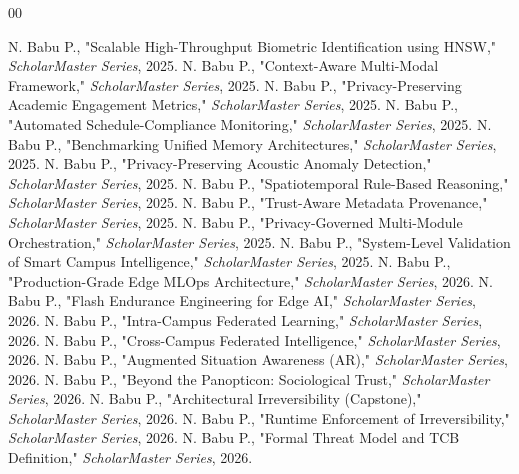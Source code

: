 \documentclass[conference]{IEEEtran}
\theoremstyle{definition}
\begin{document}
\begin{thebibliography}{00}

 N. Babu P., "Scalable High-Throughput Biometric Identification using HNSW," \textit{ScholarMaster Series}, 2025.
 N. Babu P., "Context-Aware Multi-Modal Framework," \textit{ScholarMaster Series}, 2025.
 N. Babu P., "Privacy-Preserving Academic Engagement Metrics," \textit{ScholarMaster Series}, 2025.
 N. Babu P., "Automated Schedule-Compliance Monitoring," \textit{ScholarMaster Series}, 2025.
 N. Babu P., "Benchmarking Unified Memory Architectures," \textit{ScholarMaster Series}, 2025.
 N. Babu P., "Privacy-Preserving Acoustic Anomaly Detection," \textit{ScholarMaster Series}, 2025.
 N. Babu P., "Spatiotemporal Rule-Based Reasoning," \textit{ScholarMaster Series}, 2025.
 N. Babu P., "Trust-Aware Metadata Provenance," \textit{ScholarMaster Series}, 2025.
 N. Babu P., "Privacy-Governed Multi-Module Orchestration," \textit{ScholarMaster Series}, 2025.
 N. Babu P., "System-Level Validation of Smart Campus Intelligence," \textit{ScholarMaster Series}, 2025.
 N. Babu P., "Production-Grade Edge MLOps Architecture," \textit{ScholarMaster Series}, 2026.
 N. Babu P., "Flash Endurance Engineering for Edge AI," \textit{ScholarMaster Series}, 2026.
 N. Babu P., "Intra-Campus Federated Learning," \textit{ScholarMaster Series}, 2026.
 N. Babu P., "Cross-Campus Federated Intelligence," \textit{ScholarMaster Series}, 2026.
 N. Babu P., "Augmented Situation Awareness (AR)," \textit{ScholarMaster Series}, 2026.
 N. Babu P., "Beyond the Panopticon: Sociological Trust," \textit{ScholarMaster Series}, 2026.
 N. Babu P., "Architectural Irreversibility (Capstone)," \textit{ScholarMaster Series}, 2026.
 N. Babu P., "Runtime Enforcement of Irreversibility," \textit{ScholarMaster Series}, 2026.
 N. Babu P., "Formal Threat Model and TCB Definition," \textit{ScholarMaster Series}, 2026.

\end{thebibliography}
\end{document}
